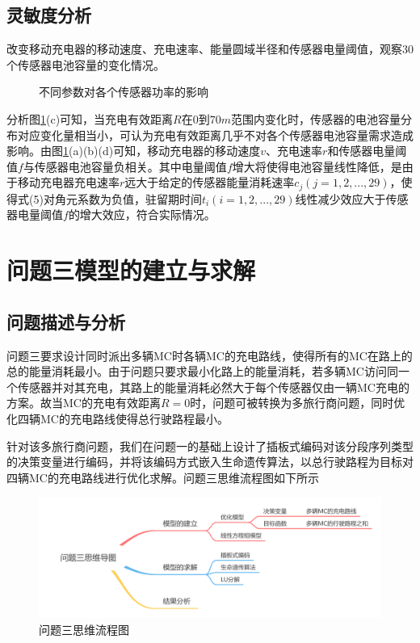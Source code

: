 \documentclass{whutmod}
\begin{document}
		
        \subsection{灵敏度分析}

		改变移动充电器的移动速度、充电速率、能量圆域半径和传感器电量阈值，观察$30$个传感器电池容量的变化情况。
		
	\begin{figure}[H]
		\centering
	\end{figure}	
	\begin{figure}[H]
		\centering
		\caption{不同参数对各个传感器功率的影响}
		\label{mgh}
	\end{figure}

		分析图\ref{mgh}(c)可知，当充电有效距离$R$在$0$到$70m$范围内变化时，传感器的电池容量分布对应变化量相当小，可认为充电有效距离几乎不对各个传感器电池容量需求造成影响。由图\ref{mgh}(a)(b)(d)可知，移动充电器的移动速度$v$、充电速率$r$和传感器电量阈值$f$与传感器电池容量负相关。其中电量阈值$f$增大将使得电池容量线性降低，是由于移动充电器充电速率$r$远大于给定的传感器能量消耗速率$c_j(j=1,2,...,29)$，使得式(5)对角元系数为负值，驻留期时间$t_i(i=1,2,...,29)$线性减少效应大于传感器电量阈值$f$的增大效应，符合实际情况。
    \section{问题三模型的建立与求解}
    \subsection{问题描述与分析}
    问题三要求设计同时派出多辆MC时各辆MC的充电路线，使得所有的MC在路上的总的能量消耗最小。由于问题只要求最小化路上的能量消耗，若多辆MC访问同一个传感器并对其充电，其路上的能量消耗必然大于每个传感器仅由一辆MC充电的方案。故当MC的充电有效距离$R=0$时，问题可被转换为多旅行商问题，同时优化四辆MC的充电路线使得总行驶路程最小。
    
    针对该多旅行商问题，我们在问题一的基础上设计了插板式编码对该分段序列类型的决策变量进行编码，并将该编码方式嵌入生命遗传算法，以总行驶路程为目标对四辆MC的充电路线进行优化求解。问题三思维流程图如下所示
    
    \begin{figure}[H]
    	\centering
    	\includegraphics[width=\textwidth]{figures/3.png}
    	\caption{问题三思维流程图}\label{asdf}
    \end{figure}
\end{document}
